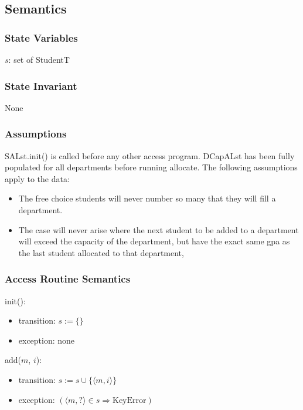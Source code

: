 \documentclass[12pt]{article}
\begin{document}
\subsection* {Semantics}

\subsubsection* {State Variables}

$s$: set of StudentT

\subsubsection* {State Invariant}

None

\subsubsection* {Assumptions}

SALst.init() is called before any other access program.
DCapALst has been fully populated for all departments before running
allocate.  The following assumptions apply to the data:
\begin{itemize}
	\item The free choice students will never number so many that they will
          fill a department.
        \item The case will never arise where the next student to be added to a
          department will exceed the capacity of the department, but have the
          exact same gpa as the last student allocated to that department,
\end{itemize}

\subsubsection* {Access Routine Semantics}

\noindent init():
\begin{itemize}
\item transition: $s := \{ \}$
\item exception: none
\end{itemize}

\noindent add($m$, $i$):
\begin{itemize}
\item transition: $s := s \cup \{ \langle m, i \rangle \}$
\item exception: $(\langle m, ? \rangle \in s \Rightarrow \text{KeyError} )$
\end{itemize}
\end{document}
